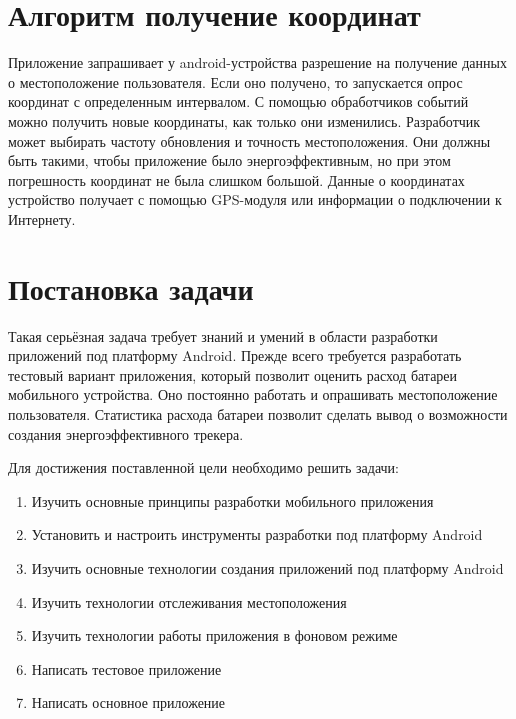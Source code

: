 \documentclass[a4paper,12pt]{article}
\begin{document}
\pagebreak

\section{Алгоритм получение координат}
Приложение запрашивает у android-устройства разрешение на получение
данных о местоположение пользователя. Если оно получено, то
запускается опрос координат с определенным интервалом. С помощью
обработчиков событий можно получить новые координаты, как только они
изменились. Разработчик может выбирать частоту обновления и точность 
местоположения. Они должны быть такими, чтобы приложение было 
энергоэффективным, но при этом погрешность координат не была 
слишком большой. Данные о координатах устройство получает с помощью
GPS-модуля или информации о подключении к Интернету\cite{documentation}.

\pagebreak


\section{Постановка задачи}

Такая серьёзная задача требует знаний и умений в области
разработки приложений под платформу Android. Прежде всего
требуется разработать тестовый вариант приложения, который
позволит оценить расход батареи мобильного устройства. Оно
постоянно работать и опрашивать местоположение пользователя.
Статистика расхода батареи позволит сделать вывод
о возможности создания энергоэффективного трекера.

Для достижения поставленной цели необходимо решить задачи:

\begin{enumerate}
\item Изучить основные принципы разработки мобильного приложения
\item Установить и настроить инструменты разработки под платформу Android
\item Изучить основные технологии создания приложений под платформу Android
\item Изучить технологии отслеживания местоположения
\item Изучить технологии работы приложения в фоновом режиме
\item Написать тестовое приложение
\item Написать основное приложение
\end{enumerate}
\end{document}
